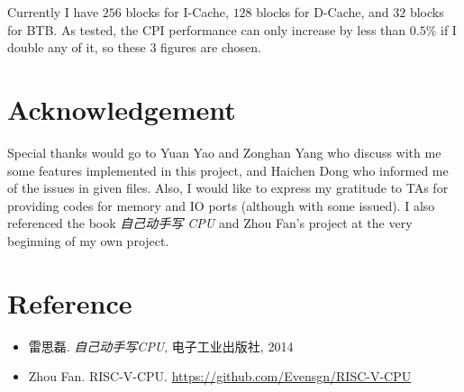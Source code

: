 \documentclass{article}
\begin{document}
\begin{description}
                Currently I have $256$ blocks for I-Cache, $128$ blocks for D-Cache,
                and $32$ blocks for BTB.
                As tested, the CPI performance can only increase by less than $0.5\%$ if I double any of it,
                so these $3$ figures are chosen.
        \end{description}

    \section{Acknowledgement}

        Special thanks would go to Yuan Yao and Zonghan Yang who discuss with me some features implemented in this project,
        and Haichen Dong who informed me of the issues in given files.
        Also, I would like to express my gratitude to TAs
        for providing codes for memory and IO ports (although with some issued).
        I also referenced the book \textit{自己动手写 CPU} and Zhou Fan's project at the very beginning of my own project.

    \section*{Reference}

        \begin{itemize}
            \item 雷思磊. \textit{自己动手写CPU}, 电子工业出版社, 2014
            \item Zhou Fan. RISC-V-CPU. \url{https://github.com/Evensgn/RISC-V-CPU}
        \end{itemize}
\end{document}
